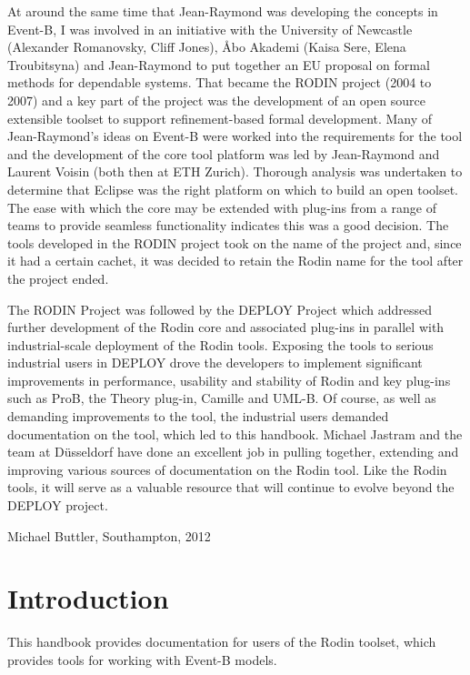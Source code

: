\documentclass[12pt]{book}
\begin{document}
At around the same time that Jean-Raymond was developing the concepts in Event-B, I was involved in an initiative with the University of Newcastle (Alexander Romanovsky, Cliff Jones), {\AA}bo Akademi  (Kaisa Sere, Elena Troubitsyna) and Jean-Raymond to put together an EU proposal on formal methods for dependable systems.  That became the RODIN project (2004 to 2007) and a key part of the project was the development of an open source extensible toolset to support refinement-based formal development.  Many of Jean-Raymond’s ideas on Event-B were worked into the requirements for the tool and the development of the core tool platform was led by Jean-Raymond and Laurent Voisin (both then at ETH Zurich). Thorough analysis was undertaken to determine that Eclipse was the right platform on which to build an open toolset.  The ease with which the core may be extended with plug-ins from a range of teams to provide seamless functionality indicates this was a good decision. The tools developed in the RODIN project took on the name of the project and, since it had a certain cachet, it was decided to retain the Rodin name for the tool after the project ended.

The RODIN Project was followed by the DEPLOY Project which addressed further development of the Rodin core and associated plug-ins in parallel with industrial-scale deployment of the Rodin tools.  Exposing the tools to serious industrial users in DEPLOY drove the developers to implement significant improvements in performance, usability and stability of Rodin and key plug-ins such as ProB, the Theory plug-in, Camille and UML-B.  Of course, as well as demanding improvements to the tool, the industrial users demanded documentation on the tool, which led to this handbook.  Michael Jastram and the team at D\"{u}sseldorf have done an excellent job in pulling together, extending and improving various sources of documentation on the Rodin tool.  Like the Rodin tools, it will serve as a valuable resource that will continue to evolve beyond the DEPLOY project.

\begin{flushright}Michael Buttler, Southampton, 2012\end{flushright}

\chapter{Introduction}

This handbook provides documentation for users of the Rodin toolset, which provides tools for working with Event-B models.
\end{document}
